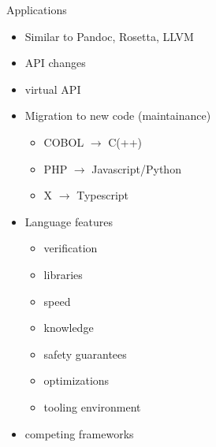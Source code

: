 \documentclass[aspectratio=169, handout]{beamer}
\begin{document}
    
    \begin{frame}{Applications}
    \begin{minipage}{.49\textwidth}
    \begin{itemize}
        \item Similar to Pandoc, Rosetta, LLVM \pause
        \item API changes \pause
        \item virtual API \pause
        \item Migration to new code (maintainance) \pause
            \begin{itemize}
                \item COBOL $\to$ C(++) \pause
                \item PHP $\to$ Javascript/Python \pause
                \item X $\to$ Typescript \pause
            \end{itemize}
    \end{itemize}
    \end{minipage}%
    \begin{minipage}{.49\textwidth}
    \begin{itemize}
        \item Language features \pause
            \begin{itemize}
                \item verification \pause
                \item libraries \pause
                \item speed \pause
                \item knowledge \pause
                \item safety guarantees \pause
                \item optimizations \pause
                \item tooling environment \pause
            \end{itemize}
        \item competing frameworks %
    \end{itemize}
    \end{minipage}
    \end{frame}
    
    
\end{document}

